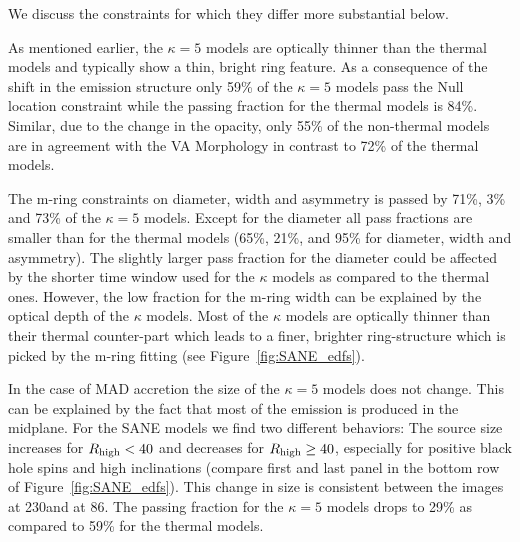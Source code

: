 We discuss the constraints for which they differ more substantial below.


As mentioned earlier, the $\kappa=5$ models are optically thinner than the thermal models and typically show a thin, bright ring feature.
As a consequence of the shift in the emission structure only 59\% of the $\kappa=5$ models pass the Null location constraint while the passing fraction for the thermal models is 84\%.
Similar, due to the change in the opacity, only 55\% of the non-thermal models are in agreement with the VA Morphology in contrast to 72\% of the thermal models.


The m-ring constraints on diameter, width and asymmetry is passed by 71\%, 3\% and 73\% of the $\kappa=5$ models.
Except for the diameter all pass fractions are smaller than for the thermal models (65\%, 21\%, and 95\% for diameter, width and asymmetry).
The slightly larger pass fraction for the diameter could be affected by the shorter time window used for the $\kappa$ models as compared to the thermal ones.
However, the low fraction for the m-ring width can be explained by the optical depth of the $\kappa$ models.
Most of the $\kappa$ models are optically thinner than their thermal counter-part which leads to a finer, brighter ring-structure which is picked by the m-ring fitting (see Figure~\ref{fig:SANE_edfs}).


In the case of MAD accretion the size of the $\kappa=5$ models does not change.
This can be explained by the fact that most of the emission is produced in the midplane.
For the SANE models we find two different behaviors: The source size increases for $R_\mathrm{high} < 40$ and decreases for $R_\mathrm{high} \geq 40$, especially for positive black hole spins and high inclinations (compare first and last panel in the bottom row of Figure~\ref{fig:SANE_edfs}).
This change in size is consistent between the images at 230\GHz and at 86\GHz.
The passing fraction for the $\kappa=5$ models drops to 29\% as compared to 59\% for the thermal models.


